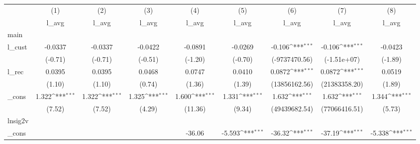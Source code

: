 {
\def\sym#1{\ifmmode^{#1}\else\(^{#1}\)\fi}
\begin{tabular}{l*{8}{c}}
\hline\hline
            &\multicolumn{1}{c}{(1)}&\multicolumn{1}{c}{(2)}&\multicolumn{1}{c}{(3)}&\multicolumn{1}{c}{(4)}&\multicolumn{1}{c}{(5)}&\multicolumn{1}{c}{(6)}&\multicolumn{1}{c}{(7)}&\multicolumn{1}{c}{(8)}\\
            &\multicolumn{1}{c}{l\_avg}&\multicolumn{1}{c}{l\_avg}&\multicolumn{1}{c}{l\_avg}&\multicolumn{1}{c}{l\_avg}&\multicolumn{1}{c}{l\_avg}&\multicolumn{1}{c}{l\_avg}&\multicolumn{1}{c}{l\_avg}&\multicolumn{1}{c}{l\_avg}\\
\hline
main        &                     &                     &                     &                     &                     &                     &                     &                     \\
l\_cust      &     -0.0337         &     -0.0337         &     -0.0422         &     -0.0891         &     -0.0269         &      -0.106\sym{***}&      -0.106\sym{***}&     -0.0423         \\
            &     (-0.71)         &     (-0.71)         &     (-0.51)         &     (-1.20)         &     (-0.70)         &(-9737470.56)         & (-1.51e+07)         &     (-1.89)         \\
[1em]
l\_rec       &      0.0395         &      0.0395         &      0.0468         &      0.0747         &      0.0410         &      0.0872\sym{***}&      0.0872\sym{***}&      0.0519         \\
            &      (1.10)         &      (1.10)         &      (0.74)         &      (1.36)         &      (1.39)         &(13856162.56)         &(21383358.20)         &      (1.89)         \\
[1em]
\_cons      &       1.322\sym{***}&       1.322\sym{***}&       1.325\sym{***}&       1.600\sym{***}&       1.331\sym{***}&       1.632\sym{***}&       1.632\sym{***}&       1.344\sym{***}\\
            &      (7.52)         &      (7.52)         &      (4.29)         &     (11.36)         &      (9.34)         &(49439682.54)         &(77066416.51)         &      (5.73)         \\
\hline
lnsig2v     &                     &                     &                     &                     &                     &                     &                     &                     \\
\_cons      &                     &                     &                     &      -36.06         &      -5.593\sym{***}&      -36.32\sym{***}&      -37.19\sym{***}&      -5.338\sym{***}\\

\end{tabular}}
